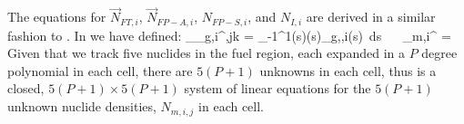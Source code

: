 The equations for $\vec{N}_{FT,i}$, $\vec{N}_{FP-A,i}$, $N_{FP-S,i}$, and $N_{I,i}$ are derived in a similar fashion to .  
In  we have defined:
\benum
\Mw_{\phi_{g,i}^{\tau},jk} = \int_{-1}^{1}{(s)(s)\widetilde{\phi}_{g,\tau,i}(s)~ds} ~~
\label{eq:mw_mat}
\eenum
\benum
{}_{m,i}^{\tau} = 
 \pep
\eenum
Given that we track five nuclides in the fuel region, each expanded in a $P$ degree polynomial in each cell, there are $5(P+1)$ unknowns in each cell, thus  is a closed, $5(P+1) \times 5(P+1)$ system of linear equations for the $5(P+1)$ unknown nuclide densities, $N_{m,i,j}$ in each cell.
